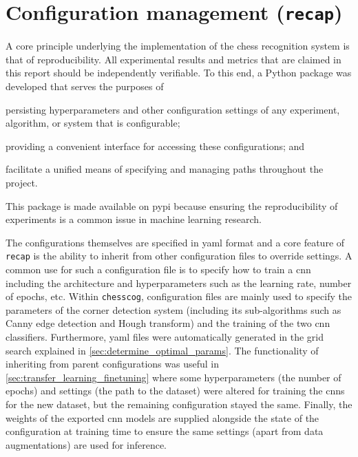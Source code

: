 \documentclass[../report.tex]{subfiles}
\begin{document}
\section{Configuration management (\texttt{recap})}
A core principle underlying the implementation of the chess recognition system is that of reproducibility.
All experimental results and metrics that are claimed in this report should be independently verifiable.
To this end, a Python package was developed that serves the purposes of 
\begin{enumerate*}[label=(\roman*)]
    \item persisting hyperparameters and other configuration settings of any experiment, algorithm, or system that is configurable;
    \item providing a convenient interface for accessing these configurations; and
    \item facilitate a unified means of specifying and managing paths throughout the project.
\end{enumerate*}
This package is made available on \gls{pypi} because ensuring the reproducibility of experiments is a common issue in machine learning research.

The configurations themselves are specified in \gls{yaml} format and a core feature of \texttt{recap} is the ability to inherit from other configuration files to override settings.
A common use for such a configuration file is to specify how to train a \gls{cnn} including the architecture and hyperparameters such as the learning rate, number of epochs, etc.
Within \texttt{chesscog}, configuration files are mainly used to specify the parameters of the corner detection system (including its sub-algorithms such as Canny edge detection and Hough transform) and the training of the two \gls{cnn} classifiers.
Furthermore, \gls{yaml} files were automatically generated in the grid search explained in \cref{sec:determine_optimal_params}.
The functionality of inheriting from parent configurations was useful in \cref{sec:transfer_learning_finetuning} where some hyperparameters (the number of epochs) and settings (the path to the dataset) were altered for training the \glspl{cnn} for the new dataset, but the remaining configuration stayed the same.
Finally, the weights of the exported \gls{cnn} models are supplied alongside the state of the configuration at training time to ensure the same settings (apart from data augmentations) are used for inference.
\end{document}
